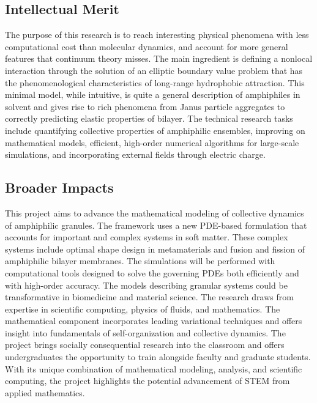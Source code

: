 \documentclass[10pt]{article}
\begin{document}
\subsection*{Intellectual Merit}
\vspace{-0.1in}
The purpose of this research is to reach interesting physical phenomena
with less computational cost than molecular dynamics, and account for
more general features that continuum theory misses. The main ingredient
is defining a nonlocal interaction through the solution of an elliptic
boundary value problem that has the phenomenological characteristics of
long-range hydrophobic attraction. This minimal model, while intuitive,
is quite a general description of amphiphiles in solvent and gives rise
to rich phenomena from Janus particle aggregates to correctly predicting
elastic properties of bilayer. The technical research tasks include
quantifying collective properties of amphiphilic ensembles, improving on
mathematical models, efficient, high-order numerical algorithms for
large-scale simulations, and incorporating external fields through
electric charge.

\subsection*{Broader Impacts}
\vspace{-0.1in}
This project aims to advance the mathematical modeling of collective
dynamics of amphiphilic granules. The framework uses a new PDE-based
formulation that accounts for important and complex systems in soft
matter. These complex systems include optimal shape design in
metamaterials and fusion and fission of amphiphilic bilayer membranes.
The simulations will be performed with computational tools designed to
solve the governing PDEs both efficiently and with high-order accuracy.
The models describing granular systems could be transformative in
biomedicine and material science. The research draws from expertise in
scientific computing, physics of fluids, and mathematics. The
mathematical component incorporates leading variational techniques and
offers insight into fundamentals of self-organization and collective
dynamics. The project brings socially consequential research into the
classroom and offers undergraduates the opportunity to train alongside
faculty and graduate students. With its unique combination of
mathematical modeling, analysis, and scientific computing, the project
highlights the potential advancement of STEM from applied mathematics.
\end{document}
